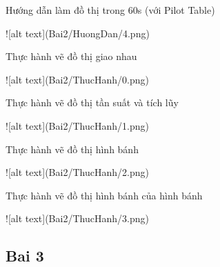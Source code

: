 \documentclass{article}
\begin{document}
\caption{Hướng dẫn làm đồ thị trong 60s (với Pilot Table)}
![alt text](Bai2/HuongDan/4.png)


\caption{Thực hành vẽ đồ thị giao nhau}
![alt text](Bai2/ThucHanh/0.png)
\caption{Thực hành vẽ đồ thị tần suất và tích lũy}
![alt text](Bai2/ThucHanh/1.png)
\caption{Thực hành vẽ đồ thị hình bánh}
![alt text](Bai2/ThucHanh/2.png)
\caption{Thực hành vẽ đồ thị hình bánh của hình bánh}
![alt text](Bai2/ThucHanh/3.png)
\subsection{Bai 3}

\end{document}
